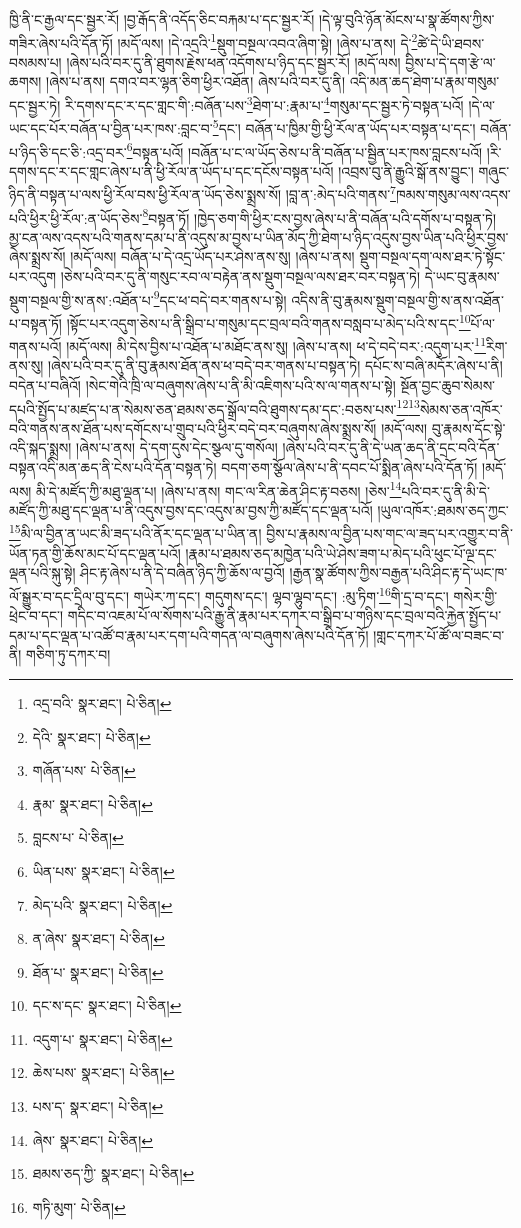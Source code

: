 ཁྱི་ནི་ང་རྒྱལ་དང་སྦྱར་རོ། །བྱ་རྒོད་ནི་འདོད་ཅིང་བརྐམ་པ་དང་སྦྱར་རོ། །དེ་ལྟ་བུའི་ཉོན་མོངས་པ་སྣ་ཚོགས་ཀྱིས་གཟིར་ཞེས་པའི་དོན་ཏོ། །མདོ་ལས། །དེ་འདྲའི་\footnote{འདྲ་བའི་  སྣར་ཐང་།  པེ་ཅིན། }སྡུག་བསྔལ་འབའ་ཞིག་སྟེ། །ཞེས་པ་ནས། དེ་\footnote{དེའི་  སྣར་ཐང་།  པེ་ཅིན། }ཚེ་དེ་ཡི་ཐབས་བསམས་པ། །ཞེས་པའི་བར་དུ་ནི་ཐུགས་རྗེས་ཕན་འདོགས་པ་ཉིད་དང་སྦྱར་རོ། །མདོ་ལས། བྱིས་པ་དེ་དག་རྩེ་ལ་ཆགས། །ཞེས་པ་ནས། དགའ་བར་ལྷན་ཅིག་ཕྱིར་འཐོན། ཞེས་པའི་བར་དུ་ནི། འདི་མན་ཆད་ཐེག་པ་རྣམ་གསུམ་དང་སྦྱར་ཏེ། རི་དགས་དང་ར་དང་གླང་གི་:བཞོན་པས་\footnote{གཞོན་པས་  པེ་ཅིན། }ཐེག་པ་:རྣམ་པ་\footnote{རྣམ་  སྣར་ཐང་།  པེ་ཅིན། }གསུམ་དང་སྦྱར་ཏེ་བསྟན་པའོ། །དེ་ལ་ཡང་དང་པོར་བཞོན་པ་བྱིན་པར་ཁས་:བླང་བ་\footnote{བླངས་པ་  པེ་ཅིན། }དང་། བཞོན་པ་ཁྱིམ་གྱི་ཕྱི་རོལ་ན་ཡོད་པར་བསྟན་པ་དང་། བཞོན་པ་ཉིད་ཅི་དང་ཅི་:འདྲ་བར་\footnote{ཡིན་པས་  སྣར་ཐང་།  པེ་ཅིན། }བསྟན་པའོ། །བཞོན་པ་ང་ལ་ཡོད་ཅེས་པ་ནི་བཞོན་པ་སྦྱིན་པར་ཁས་བླངས་པའོ། །རི་དགས་དང་ར་དང་གླང་ཞེས་པ་ནི་ཕྱི་རོལ་ན་ཡོད་པ་དང་དངོས་བསྟན་པའོ། །འབྲས་བུ་ནི་རྒྱུའི་སྒོ་ནས་བྱུང་། གཞུང་ཉིད་ནི་བསྟན་པ་ལས་ཕྱི་རོལ་བས་ཕྱི་རོལ་ན་ཡོད་ཅེས་སྨྲས་སོ། །བླ་ན་:མེད་པའི་གནས་\footnote{མེད་པའི་  སྣར་ཐང་།  པེ་ཅིན། }ཁམས་གསུམ་ལས་འདས་པའི་ཕྱིར་ཕྱི་རོལ་:ན་ཡོད་ཅེས་\footnote{ན་ཞེས་  སྣར་ཐང་།  པེ་ཅིན། }བསྟན་ཏོ། །ཁྱེད་ཅག་གི་ཕྱིར་ངས་བྱས་ཞེས་པ་ནི་བཞོན་པའི་དགོས་པ་བསྟན་ཏེ། མྱ་ངན་ལས་འདས་པའི་གནས་དམ་པ་ནི་འདུས་མ་བྱས་པ་ཡིན་མོད་ཀྱི་ཐེག་པ་ཉིད་འདུས་བྱས་ཡིན་པའི་ཕྱིར་བྱས་ཞེས་སྨྲས་སོ། །མདོ་ལས། བཞོན་པ་དེ་འདྲ་ཡོད་པར་ཤེས་ནས་སུ། །ཞེས་པ་ནས། སྡུག་བསྔལ་དག་ལས་ཐར་ཏེ་སྟོང་པར་འདུག །ཅེས་པའི་བར་དུ་ནི་གསུང་རབ་ལ་བརྟེན་ནས་སྡུག་བསྔལ་ལས་ཐར་བར་བསྟན་ཏེ། དེ་ཡང་བུ་རྣམས་སྡུག་བསྔལ་གྱི་ས་ནས་:འཐོན་པ་\footnote{ཐོན་པ་  སྣར་ཐང་།  པེ་ཅིན། }དང་ཕ་བདེ་བར་གནས་པ་སྟེ། འདིས་ནི་བུ་རྣམས་སྡུག་བསྔལ་གྱི་ས་ནས་འཐོན་པ་བསྟན་ཏོ། །སྟོང་པར་འདུག་ཅེས་པ་ནི་སྒྲིབ་པ་གསུམ་དང་བྲལ་བའི་གནས་བསླབ་པ་མེད་པའི་ས་དང་\footnote{དང་ས་དང་  སྣར་ཐང་།  པེ་ཅིན། }པོ་ལ་གནས་པའོ། །མདོ་ལས། མི་དེས་བྱིས་པ་འཐོན་པ་མཐོང་ནས་སུ། །ཞེས་པ་ནས། ཕ་དེ་བདེ་བར་:འདུག་པར་\footnote{འདུག་པ་  སྣར་ཐང་།  པེ་ཅིན། }རིག་ནས་སུ། །ཞེས་པའི་བར་དུ་ནི་བུ་རྣམས་ཐོན་ནས་ཕ་བདེ་བར་གནས་པ་བསྟན་ཏེ། དཔོང་ས་བཞི་མདོར་ཞེས་པ་ནི། བདེན་པ་བཞིའོ། །སེང་གེའི་ཁྲི་ལ་བཞུགས་ཞེས་པ་ནི་མི་འཇིགས་པའི་ས་ལ་གནས་པ་སྟེ། སྔོན་བྱང་ཆུབ་སེམས་དཔའི་སྤྱོད་པ་མཛད་པ་ན་སེམས་ཅན་ཐམས་ཅད་སྒྲོལ་བའི་ཐུགས་དམ་དང་:བཅས་པས་\footnote{ཆེས་པས་  སྣར་ཐང་།  པེ་ཅིན། }\footnote{པས་ད་  སྣར་ཐང་།  པེ་ཅིན། }སེམས་ཅན་འཁོར་བའི་གནས་ནས་ཐོན་པས་དགོངས་པ་གྲུབ་པའི་ཕྱིར་བདེ་བར་བཞུགས་ཞེས་སྨྲས་སོ། །མདོ་ལས། བུ་རྣམས་དོང་སྟེ་འདི་སྐད་སྨྲས། །ཞེས་པ་ནས། དེ་དག་དུས་དེང་སྩལ་དུ་གསོལ། །ཞེས་པའི་བར་དུ་ནི་དེ་ཡན་ཆད་ནི་དྲང་བའི་དོན་བསྟན་འདི་མན་ཆད་ནི་ངེས་པའི་དོན་བསྟན་ཏེ། བདག་ཅག་སྩོལ་ཞེས་པ་ནི་དབང་པོ་སྨིན་ཞེས་པའི་དོན་ཏོ། །མདོ་ལས། མི་དེ་མཛོད་ཀྱི་མཐུ་ལྡན་པ། །ཞེས་པ་ནས། གང་ལ་རིན་ཆེན་ཤིང་རྟ་བཅས། །ཅེས་\footnote{ཞེས་  སྣར་ཐང་།  པེ་ཅིན། }པའི་བར་དུ་ནི་མི་དེ་མཛོད་ཀྱི་མཐུ་དང་ལྡན་པ་ནི་འདུས་བྱས་དང་འདུས་མ་བྱས་ཀྱི་མཛོད་དང་ལྡན་པའོ། །ཡུལ་འཁོར་:ཐམས་ཅད་ཀྱང་\footnote{ཐམས་ཅད་ཀྱི་  སྣར་ཐང་།  པེ་ཅིན། }མི་ལ་བྱིན་ན་ཡང་མི་ཟད་པའི་ནོར་དང་ལྡན་པ་ཡིན་ན། བྱིས་པ་རྣམས་ལ་བྱིན་པས་གང་ལ་ཟད་པར་འགྱུར་བ་ནི་ཡོན་ཏན་གྱི་ཆོས་མང་པོ་དང་ལྡན་པའོ། །རྣམ་པ་ཐམས་ཅད་མཁྱེན་པའི་ཡེ་ཤེས་ཟག་པ་མེད་པའི་ཕུང་པོ་ལྔ་དང་ལྡན་པའི་སྐུ་སྟེ། ཤིང་རྟ་ཞེས་པ་ནི་དེ་བཞིན་ཉིད་ཀྱི་ཆོས་ལ་བྱའོ། །རྒྱན་སྣ་ཚོགས་ཀྱིས་བརྒྱན་པའི་ཤིང་རྟ་དེ་ཡང་ཁ་ལོ་སྒྱུར་བ་དང་དྲིལ་བུ་དང་། གཡེར་ཀ་དང་། གདུགས་དང་། ལྷབ་ལྷུབ་དང་། :མུ་ཏིག་\footnote{གཏི་མུག་  པེ་ཅིན། }གི་དྲ་བ་དང་། གསེར་གྱི་ཕྲེང་བ་དང་། གདིང་བ་འཇམ་པོ་ལ་སོགས་པའི་རྒྱུ་ནི་རྣམ་པར་དཀར་བ་སྒྲིབ་པ་གཉིས་དང་བྲལ་བའི་རྐྱེན་སྤྱོད་པ་དམ་པ་དང་ལྡན་པ་འཚོ་བ་རྣམ་པར་དག་པའི་གདན་ལ་བཞུགས་ཞེས་པའི་དོན་ཏོ། །གླང་དཀར་པོ་ཚོ་ལ་བཟང་བ་ནི། གཅིག་ཏུ་དཀར་བ། 